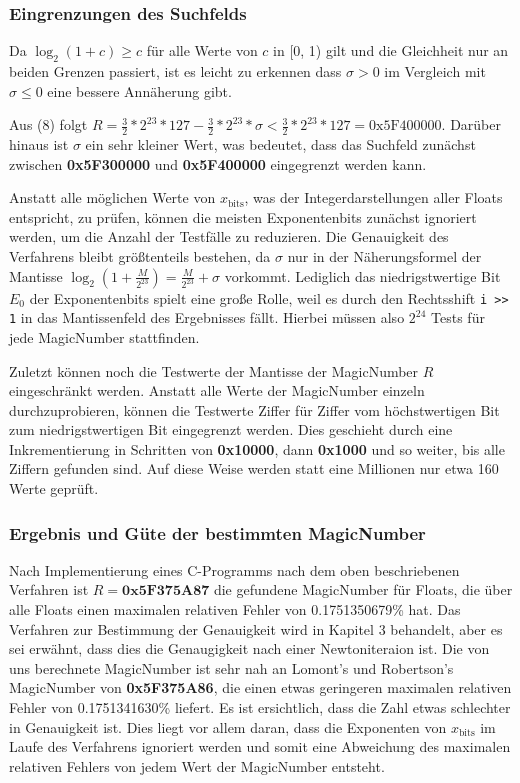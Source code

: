\documentclass[course=erap]{aspdoc}
\begin{document}
\subsubsection{Eingrenzungen des Suchfelds}
Da $\log_2(1 + c) \ge c$ für alle Werte von $c$ in [0, 1) gilt und die Gleichheit nur an beiden Grenzen passiert, ist es leicht zu erkennen dass $\sigma > 0$ im Vergleich mit $\sigma \le 0$ eine bessere Annäherung gibt.\par
Aus (8) folgt $R = \frac{3}{2} * 2^{23} * 127 - \frac{3}{2} * 2^{23} * \sigma
< \frac{3}{2} * 2^{23} * 127 = \text{0x5F400000}$. Darüber hinaus ist $\sigma$ ein sehr kleiner Wert, was bedeutet, dass das Suchfeld zunächst zwischen \textbf{0x5F300000} und \textbf{0x5F400000} eingegrenzt werden kann.\par
Anstatt alle möglichen Werte von $x_{\text{bits}}$, was der Integerdarstellungen aller Floats entspricht, zu prüfen, können die meisten Exponentenbits zunächst ignoriert werden, um die Anzahl der Testfälle zu reduzieren. Die Genauigkeit des Verfahrens bleibt größtenteils bestehen, da $\sigma$ nur in der Näherungsformel der Mantisse $\log_2(1 + \frac{M}{2^{23}}) = \frac{M}{2^{23}} + \sigma$ vorkommt. Lediglich das niedrigstwertige Bit $E_0$ der Exponentenbits spielt eine große Rolle, weil es durch den Rechtsshift \lstinline{i >> 1} in das Mantissenfeld des Ergebnisses fällt. Hierbei müssen also $2^{24}$ Tests für jede MagicNumber stattfinden.\par
Zuletzt können noch die Testwerte der Mantisse der MagicNumber $R$ eingeschränkt werden. Anstatt alle Werte der MagicNumber einzeln durchzuprobieren, können die Testwerte Ziffer für Ziffer vom höchstwertigen Bit zum niedrigstwertigen Bit eingegrenzt werden. Dies geschieht durch eine Inkrementierung in Schritten von \textbf{0x10000}, dann \textbf{0x1000} und so weiter, bis alle Ziffern gefunden sind. Auf diese Weise werden statt eine Millionen nur etwa 160 Werte geprüft.
\subsubsection{Ergebnis und Güte der bestimmten MagicNumber}
Nach Implementierung eines C-Programms nach dem oben beschriebenen Verfahren ist \boldmath $R = \textbf{0x5F375A87}$ \unboldmath die gefundene MagicNumber für Floats, die über alle Floats einen maximalen relativen Fehler von 0.1751350679\% hat. Das Verfahren zur Bestimmung der Genauigkeit wird in Kapitel 3 behandelt, aber es sei erwähnt, dass dies die Genaugigkeit nach einer Newtoniteraion ist. Die von uns berechnete MagicNumber ist sehr nah an Lomont's und Robertson's MagicNumber von \textbf{0x5F375A86}, die einen etwas geringeren maximalen relativen Fehler von 0.1751341630\% liefert. Es ist ersichtlich, dass die Zahl etwas schlechter in Genauigkeit ist. Dies liegt vor allem daran, dass die Exponenten von $x_\text{bits}$ im Laufe des Verfahrens ignoriert werden und somit eine Abweichung des maximalen relativen Fehlers von jedem Wert der MagicNumber entsteht.
\end{document}
